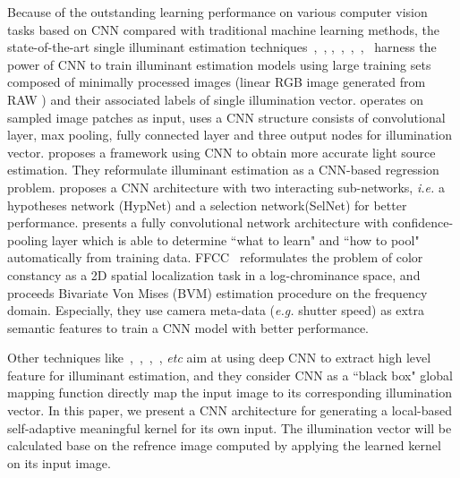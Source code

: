 \documentclass[10pt,twocolumn,letterpaper]{article}
\begin{document}
Because of the outstanding learning performance on various computer vision tasks based on CNN
compared with traditional machine learning methods,
the state-of-the-art single illuminant estimation techniques~\cite{bianco2015color},~\cite{lou2015color},
\cite{shi2016deep},~\cite{hu2017fc},~\cite{DBLP:journals/corr/BarronT16},~\cite{bianco2015single},~\cite{gijsenij2012color}
harness the power of CNN to train illuminant estimation models using large training sets
composed of minimally processed images (linear RGB image generated from RAW ) and
their associated labels of single illumination vector.
\cite{bianco2015color} operates on sampled image patches as input,
uses a CNN structure consists of convolutional layer, max pooling,
fully connected layer and three output nodes for illumination vector.
\cite{lou2015color} proposes a framework using CNN to obtain more accurate light source estimation.
They reformulate illuminant estimation as a CNN-based regression problem.
\cite{shi2016deep} proposes a CNN architecture with two interacting sub-networks,
\textit{i.e.} a hypotheses network (HypNet) and a selection network(SelNet) for better performance.
\cite{hu2017fc} presents a fully convolutional network architecture with confidence-pooling layer which
is able to determine ``what to learn" and ``how to pool" automatically from training data.
FFCC~\cite{DBLP:journals/corr/BarronT16} reformulates the problem of color constancy as
a 2D spatial localization task in a log-chrominance space,
and proceeds Bivariate Von Mises (BVM) estimation procedure on the frequency domain.
Especially, they use camera meta-data (\textit{e.g.} shutter speed) as extra semantic features to
train a CNN model with better performance.

Other techniques like~\cite{bianco2015color},~\cite{lou2015color},~\cite{shi2016deep},~\cite{hu2017fc}, \textit{etc} aim at
using deep CNN to extract high level feature for illuminant estimation,
and they consider CNN as a ``black box" global mapping function directly map the input image to its corresponding illumination vector.
In this paper, we present a CNN architecture for generating a local-based self-adaptive meaningful kernel for its own input.
The illumination vector will be calculated base on the refrence image computed by applying the learned kernel on its input image.
\end{document}
